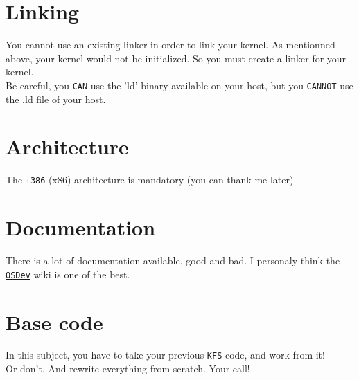 \documentclass{42-en}
\begin{document}
    \section{Linking}
        You cannot use an existing linker in order to link your kernel.
        As mentionned above, your kernel would not be initialized. So you must
        create a linker for your kernel.\\
        Be careful, you \texttt{CAN} use the 'ld' binary available on your
        host, but you \texttt{CANNOT} use the .ld file of your host.
    \section{Architecture}
        The \texttt{i386} (x86) architecture is mandatory (you can thank
        me later).
    \section{Documentation}
        There is a lot of documentation available, good and bad.
        I personaly think the \texttt{\href{http://wiki.osdev.org/Main_Page}
        {OSDev}} wiki is one of the best.
    \section{Base code}
        In this subject, you have to take your previous \texttt{KFS} code,
        and work from it!\\
        Or don't. And rewrite everything from scratch. Your call!
\newpage

\end{document}

